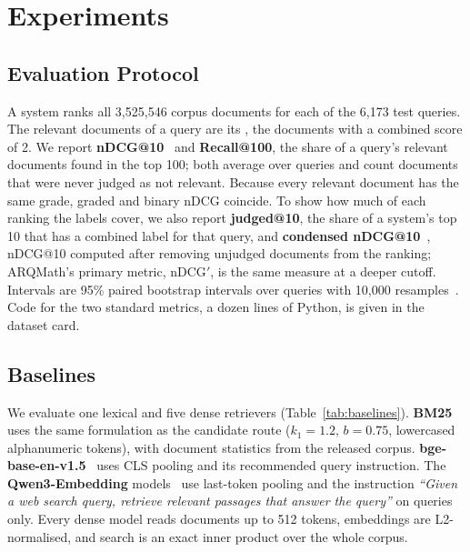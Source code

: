 \section{Experiments}
\label{sec:experiments}

\subsection{Evaluation Protocol}
\label{sec:protocol}

A system ranks all 3,525,546 corpus documents for each of the 6,173 test queries. The relevant documents of a query are its , the documents with a combined score of 2. We report \textbf{nDCG@10}~\citep{jarvelin2002ndcg} and \textbf{Recall@100}, the share of a query's relevant documents found in the top 100; both average over queries and count documents that were never judged as not relevant. Because every relevant document has the same grade, graded and binary nDCG coincide. To show how much of each ranking the labels cover, we also report \textbf{judged@10}, the share of a system's top 10 that has a combined label for that query, and \textbf{condensed nDCG@10}~\citep{sakai2007alternatives,sakai2008incomplete}, nDCG@10 computed after removing unjudged documents from the ranking; ARQMath's primary metric, nDCG$'$, is the same measure at a deeper cutoff. Intervals are 95\% paired bootstrap intervals over queries with 10,000 resamples~\citep{sakai2006bootstrap}. Code for the two standard metrics, a dozen lines of Python, is given in the dataset card.

\subsection{Baselines}
\label{sec:baselines}

We evaluate one lexical and five dense retrievers (Table~\ref{tab:baselines}). \textbf{BM25} uses the same formulation as the candidate route ($k_1 = 1.2$, $b = 0.75$, lowercased alphanumeric tokens), with document statistics from the released corpus. \textbf{bge-base-en-v1.5}~\citep{xiao2024cpack} uses CLS pooling and its recommended query instruction. The \textbf{Qwen3-Embedding} models~\citep{zhang2025qwen3embedding} use last-token pooling and the instruction \textit{``Given a web search query, retrieve relevant passages that answer the query''} on queries only. Every dense model reads documents up to 512 tokens, embeddings are L2-normalised, and search is an exact inner product over the whole corpus.

